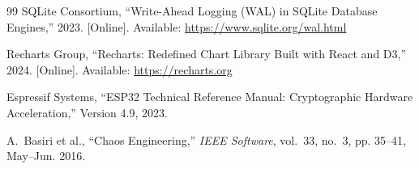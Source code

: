 \documentclass[12pt,a4paper]{report}
\begin{document}
\begin{thebibliography}{99}
SQLite Consortium, ``Write-Ahead Logging (WAL) in SQLite Database Engines,'' 2023. [Online]. Available: \url{https://www.sqlite.org/wal.html}

Recharts Group, ``Recharts: Redefined Chart Library Built with React and D3,'' 2024. [Online]. Available: \url{https://recharts.org}

Espressif Systems, ``ESP32 Technical Reference Manual: Cryptographic Hardware Acceleration,'' Version 4.9, 2023.

A.~Basiri et al., ``Chaos Engineering,'' \emph{IEEE Software}, vol.~33, no.~3, pp. 35--41, May--Jun. 2016.
\end{thebibliography}
\end{document}

